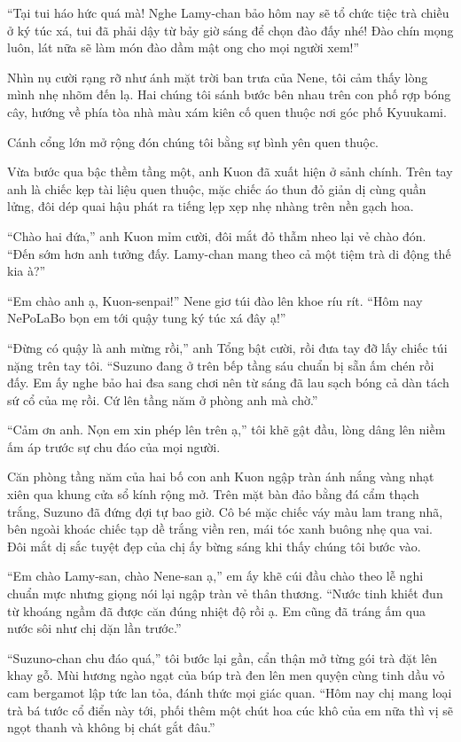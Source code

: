\documentclass[../main.tex]{subfiles}
\begin{document}
``Tại tui háo hức quá mà! Nghe Lamy-chan bảo hôm nay sẽ tổ chức tiệc trà chiều ở ký túc xá, tui đã phải dậy từ bảy giờ sáng để chọn đào đấy nhé! Đào chín mọng luôn, lát nữa sẽ làm món đào dầm mật ong cho mọi người xem!''

Nhìn nụ cười rạng rỡ như ánh mặt trời ban trưa của Nene, tôi cảm thấy lòng mình nhẹ nhõm đến lạ. Hai chúng tôi sánh bước bên nhau trên con phố rợp bóng cây, hướng về phía tòa nhà màu xám kiên cố quen thuộc nơi góc phố Kyuukami.

\ct

Cánh cổng lớn mở rộng đón chúng tôi bằng sự bình yên quen thuộc.

Vừa bước qua bậc thềm tầng một, anh Kuon đã xuất hiện ở sảnh chính. Trên tay anh là chiếc kẹp tài liệu quen thuộc, mặc chiếc áo thun đỏ giản dị cùng quần lửng, đôi dép quai hậu phát ra tiếng lẹp xẹp nhẹ nhàng trên nền gạch hoa.

``Chào hai đứa,'' anh Kuon mỉm cười, đôi mắt đỏ thẫm nheo lại vẻ chào đón. ``Đến sớm hơn anh tưởng đấy. Lamy-chan mang theo cả một tiệm trà di động thế kia à?''

``Em chào anh ạ, Kuon-senpai!'' Nene giơ túi đào lên khoe ríu rít. ``Hôm nay NePoLaBo bọn em tới quậy tung ký túc xá đây ạ!''

``Đừng có quậy là anh mừng rồi,'' anh Tổng bật cười, rồi đưa tay đỡ lấy chiếc túi nặng trên tay tôi. ``Suzuno đang ở trên bếp tầng sáu chuẩn bị sẵn ấm chén rồi đấy. Em ấy nghe bảo hai đsa sang chơi nên từ sáng đã lau sạch bóng cả dàn tách sứ cổ của mẹ rồi. Cứ lên tầng năm ở phòng anh mà chờ.''

``Cảm ơn anh. Nọn em xin phép lên trên ạ,'' tôi khẽ gật đầu, lòng dâng lên niềm ấm áp trước sự chu đáo của mọi người.

Căn phòng tầng năm của hai bố con anh Kuon ngập tràn ánh nắng vàng nhạt xiên qua khung cửa sổ kính rộng mở. Trên mặt bàn đảo bằng đá cẩm thạch trắng, Suzuno đã đứng đợi tự bao giờ. Cô bé mặc chiếc váy màu lam trang nhã, bên ngoài khoác chiếc tạp dề trắng viền ren, mái tóc xanh buông nhẹ qua vai. Đôi mắt dị sắc tuyệt đẹp của chị ấy bừng sáng khi thấy chúng tôi bước vào.

``Em chào Lamy-san, chào Nene-san ạ,'' em ấy khẽ cúi đầu chào theo lễ nghi chuẩn mực nhưng giọng nói lại ngập tràn vẻ thân thương. ``Nước tinh khiết đun từ khoáng ngầm đã được căn đúng nhiệt độ rồi ạ. Em cũng đã tráng ấm qua nước sôi như chị dặn lần trước.''

``Suzuno-chan chu đáo quá,'' tôi bước lại gần, cẩn thận mở từng gói trà đặt lên khay gỗ. Mùi hương ngào ngạt của búp trà đen lên men quyện cùng tinh dầu vỏ cam bergamot lập tức lan tỏa, đánh thức mọi giác quan. ``Hôm nay chị mang loại trà bá tước cổ điển này tới, phối thêm một chút hoa cúc khô của em nữa thì vị sẽ ngọt thanh và không bị chát gắt đâu.''
\end{document}
